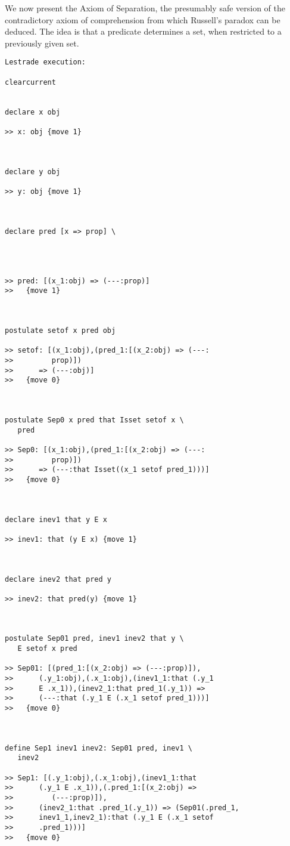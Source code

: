 \documentclass{article}
\begin{document}
We now present the Axiom of Separation, the presumably safe version of the contradictory axiom of comprehension from which Russell's paradox can be deduced.  The idea is that a predicate determines a set, when restricted to a previously given set.

\begin{verbatim}Lestrade execution:

clearcurrent


declare x obj

>> x: obj {move 1}



declare y obj

>> y: obj {move 1}



declare pred [x => prop] \
   



>> pred: [(x_1:obj) => (---:prop)]
>>   {move 1}



postulate setof x pred obj

>> setof: [(x_1:obj),(pred_1:[(x_2:obj) => (---:
>>         prop)])
>>      => (---:obj)]
>>   {move 0}



postulate Sep0 x pred that Isset setof x \
   pred

>> Sep0: [(x_1:obj),(pred_1:[(x_2:obj) => (---:
>>         prop)])
>>      => (---:that Isset((x_1 setof pred_1)))]
>>   {move 0}



declare inev1 that y E x

>> inev1: that (y E x) {move 1}



declare inev2 that pred y

>> inev2: that pred(y) {move 1}



postulate Sep01 pred, inev1 inev2 that y \
   E setof x pred

>> Sep01: [(pred_1:[(x_2:obj) => (---:prop)]),
>>      (.y_1:obj),(.x_1:obj),(inev1_1:that (.y_1
>>      E .x_1)),(inev2_1:that pred_1(.y_1)) =>
>>      (---:that (.y_1 E (.x_1 setof pred_1)))]
>>   {move 0}



define Sep1 inev1 inev2: Sep01 pred, inev1 \
   inev2

>> Sep1: [(.y_1:obj),(.x_1:obj),(inev1_1:that
>>      (.y_1 E .x_1)),(.pred_1:[(x_2:obj) =>
>>         (---:prop)]),
>>      (inev2_1:that .pred_1(.y_1)) => (Sep01(.pred_1,
>>      inev1_1,inev2_1):that (.y_1 E (.x_1 setof
>>      .pred_1)))]
>>   {move 0}




\end{verbatim}
\end{document}
